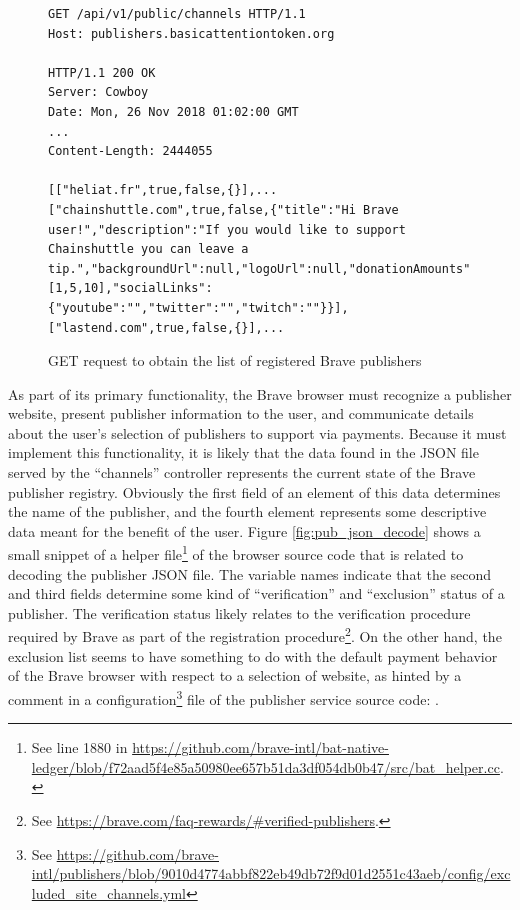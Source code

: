 \documentclass[sigconf]{acmart}
\begin{document}
\begin{figure}
\begin{lstlisting}
GET /api/v1/public/channels HTTP/1.1
Host: publishers.basicattentiontoken.org

HTTP/1.1 200 OK
Server: Cowboy
Date: Mon, 26 Nov 2018 01:02:00 GMT
...
Content-Length: 2444055

[["heliat.fr",true,false,{}],...["chainshuttle.com",true,false,{"title":"Hi Brave user!","description":"If you would like to support Chainshuttle you can leave a tip.","backgroundUrl":null,"logoUrl":null,"donationAmounts":[1,5,10],"socialLinks":{"youtube":"","twitter":"","twitch":""}}],["lastend.com",true,false,{}],...
\end{lstlisting}
\caption{GET request to obtain the list of registered Brave publishers}
\label{fig:get_pubs}
\end{figure}

As part of its primary functionality,
the Brave browser must recognize a publisher
website, present publisher information to the user,
and communicate details about the user's
selection of publishers to support via payments.
Because it must implement this functionality,
it is likely that the data found in the JSON file
served by the ``channels'' controller represents the 
current state of the Brave publisher registry.
Obviously the first field of an element of
this data determines the name of the publisher,
and the fourth element represents some
descriptive data meant for the benefit of the user.
Figure \ref{fig:pub_json_decode} shows a small snippet
of a helper file\footnote{See line 1880 in \url{https://github.com/brave-intl/bat-native-ledger/blob/f72aad5f4e85a50980ee657b51da3df054db0b47/src/bat\_helper.cc}.}
of the browser source code that is
related to decoding the publisher JSON file.
The variable names indicate that the second and third
fields determine some kind of ``verification''
and ``exclusion'' status of a publisher.
The verification status likely relates to the 
verification procedure required by Brave as part of the 
registration procedure\footnote{See \url{https://brave.com/faq-rewards/\#verified-publishers}.}.
On the other hand, the exclusion list seems to have something to
do with the default payment behavior of the Brave browser
with respect to a selection of website, as hinted by
a comment in a configuration\footnote{See \url{https://github.com/brave-intl/publishers/blob/9010d4774abbf822eb49db72f9d01d2551c43aeb/config/excluded\_site\_channels.yml}} file of the publisher service
source code:
.
\end{document}
